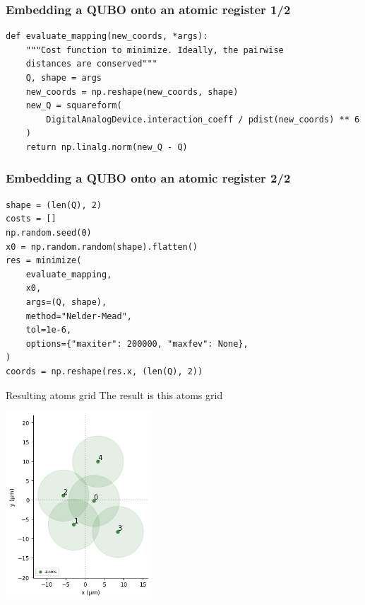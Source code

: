 \begin{frame}[fragile]
\frametitle{Embedding a QUBO onto an atomic register 1/2}  
\begin{small}
\begin{verbatim}
def evaluate_mapping(new_coords, *args):
    """Cost function to minimize. Ideally, the pairwise
    distances are conserved"""
    Q, shape = args
    new_coords = np.reshape(new_coords, shape)
    new_Q = squareform(
        DigitalAnalogDevice.interaction_coeff / pdist(new_coords) ** 6
    )
    return np.linalg.norm(new_Q - Q)

\end{verbatim}
\end{small}
\end{frame}


\begin{frame}[fragile]
\frametitle{Embedding a QUBO onto an atomic register 2/2}  
\begin{small}
\begin{verbatim}
shape = (len(Q), 2)
costs = []
np.random.seed(0)
x0 = np.random.random(shape).flatten()
res = minimize(
    evaluate_mapping,
    x0,
    args=(Q, shape),
    method="Nelder-Mead",
    tol=1e-6,
    options={"maxiter": 200000, "maxfev": None},
)
coords = np.reshape(res.x, (len(Q), 2))
\end{verbatim}
\end{small}
\end{frame}

\begin{frame}{Resulting atoms grid}
The result is this atoms grid
\begin{center}
\includegraphics[height=7cm]{images/tutorials_qubo_14_0.png}    
\end{center}
\end{frame}



